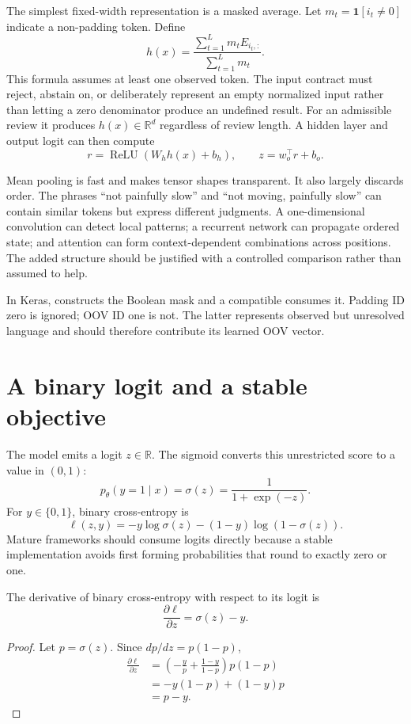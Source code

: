 The simplest fixed-width representation is a masked average. Let
$m_t=\mathbf 1[i_t\neq0]$ indicate a non-padding token. Define
\[
  h(x)=
  \frac{\sum_{t=1}^{L}m_tE_{i_t,:}}{\sum_{t=1}^{L}m_t}.
\]
This formula assumes at least one observed token. The input contract must
reject, abstain on, or deliberately represent an empty normalized input rather
than letting a zero denominator produce an undefined result.
For an admissible review it produces $h(x)\in\mathbb R^d$ regardless of review
length. A hidden layer
and output logit can then compute
\[
  r=\operatorname{ReLU}(W_hh(x)+b_h),
  \qquad
  z=w_o^\top r+b_o.
\]

Mean pooling is fast and makes tensor shapes transparent. It also largely
discards order. The phrases ``not painfully slow'' and ``not moving, painfully
slow'' can contain similar tokens but express different judgments. A
one-dimensional convolution can detect local patterns; a recurrent network can
propagate ordered state; and attention can form context-dependent combinations
across positions. The added structure should be justified with a controlled
comparison rather than assumed to help.

In Keras,  constructs the Boolean mask and a
compatible  consumes it. Padding ID zero is
ignored; OOV ID one is not. The latter represents observed but unresolved
language and should therefore contribute its learned OOV vector.

\section{A binary logit and a stable objective}

The model emits a logit $z\in\mathbb R$. The sigmoid converts this unrestricted
score to a value in $(0,1)$:
\[
  p_\theta(y=1\mid x)=\sigma(z)=\frac{1}{1+\exp(-z)}.
\]
For $y\in\{0,1\}$, binary cross-entropy is
\[
  \ell(z,y)
  =-y\log\sigma(z)-(1-y)\log(1-\sigma(z)).
\]
Mature frameworks should consume logits directly because a stable
implementation avoids first forming probabilities that round to exactly zero
or one.

\begin{proposition}
The derivative of binary cross-entropy with respect to its logit is
\[
  \frac{\partial\ell}{\partial z}=\sigma(z)-y.
\]
\end{proposition}

\begin{proof}
Let $p=\sigma(z)$. Since $dp/dz=p(1-p)$,
\[
\begin{aligned}
\frac{\partial\ell}{\partial z}
&=\left(-\frac{y}{p}+\frac{1-y}{1-p}\right)p(1-p)\\
&=-y(1-p)+(1-y)p\\
&=p-y.
\end{aligned}
\]
\end{proof}

